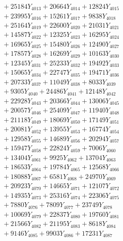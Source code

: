 \documentclass[a4paper,10pt]{article}
\begin{document}
{\begin{align}
&\;  + 25184 Y_{4013} + 20664 Y_{4014} + 12824 Y_{4015} \\[0.3ex]
&\;  + 23995 Y_{4016} + 15261 Y_{4017} + 9838 Y_{4018} \\[0.5ex]\allowbreak
&\;  + 25164 Y_{4019} + 22600 Y_{4020} + 21031 Y_{4021} \\[0.3ex]
&\;  + 14587 Y_{4022} + 12325 Y_{4023} + 16295 Y_{4024} \\[0.3ex]
&\;  + 16965 Y_{4025} + 15480 Y_{4026} + 12490 Y_{4027} \\[0.3ex]
&\;  + 17857 Y_{4028} + 16269 Y_{4029} + 10163 Y_{4030} \\[0.3ex]
&\;  + 12345 Y_{4031} + 25233 Y_{4032} + 19492 Y_{4033} \\[0.3ex]
&\;  + 15065 Y_{4034} + 22747 Y_{4035} + 19471 Y_{4036} \\[0.3ex]
&\;  + 20733 Y_{4037} + 11049 Y_{4038} + 8033 Y_{4039} \\[0.3ex]
&\;  + 9305 Y_{4040} + 24486 Y_{4041} + 12148 Y_{4042} \\[0.3ex]
&\;  + 22928 Y_{4043} + 20366 Y_{4044} + 13006 Y_{4045} \\[0.3ex]
&\;  + 20057 Y_{4046} + 25409 Y_{4047} + 11940 Y_{4048} \\[0.5ex]\allowbreak
&\;  + 21118 Y_{4049} + 18069 Y_{4050} + 17149 Y_{4051} \\[0.3ex]
&\;  + 20081 Y_{4052} + 13955 Y_{4053} + 16774 Y_{4054} \\[0.3ex]
&\;  + 12958 Y_{4055} + 14689 Y_{4056} + 20294 Y_{4057} \\[0.3ex]
&\;  + 15947 Y_{4058} + 22824 Y_{4059} + 7006 Y_{4060} \\[0.3ex]
&\;  + 13404 Y_{4061} + 9925 Y_{4062} + 13704 Y_{4063} \\[0.3ex]
&\;  + 18653 Y_{4064} + 19784 Y_{4065} + 12568 Y_{4066} \\[0.3ex]
&\;  + 18088 Y_{4067} + 6581 Y_{4068} + 24970 Y_{4069} \\[0.3ex]
&\;  + 20923 Y_{4070} + 14665 Y_{4071} + 12107 Y_{4072} \\[0.3ex]
&\;  + 14935 Y_{4073} + 25316 Y_{4074} + 22306 Y_{4075} \\[0.3ex]
&\;  + 7880 Y_{4076} + 7809 Y_{4077} + 23749 Y_{4078} \\[0.5ex]\allowbreak
&\;  + 10069 Y_{4079} + 22837 Y_{4080} + 19760 Y_{4081} \\[0.3ex]
&\;  + 21566 Y_{4082} + 21195 Y_{4083} + 8618 Y_{4084} \\[0.3ex]
&\;  + 9146 Y_{4085} + 9903 Y_{4086} + 17231 Y_{4087} \\[0.3ex]

\end{align}}
\end{document}

